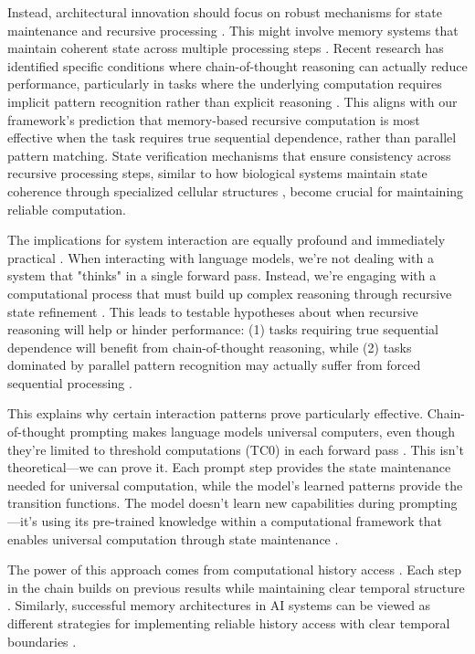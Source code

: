 \documentclass[12pt]{article}
\begin{document}
Instead, architectural innovation should focus on robust mechanisms for state maintenance and recursive processing \cite{jung2020new}.
This might involve memory systems that maintain coherent state across multiple processing steps \cite{zhu2024overcoming}.
Recent research has identified specific conditions where chain-of-thought reasoning can actually reduce performance, particularly in tasks where the underlying computation requires implicit pattern recognition rather than explicit reasoning \cite{liu2024mind}.
This aligns with our framework's prediction that memory-based recursive computation is most effective when the task requires true sequential dependence, rather than parallel pattern matching.
State verification mechanisms that ensure consistency across recursive processing steps, similar to how biological systems maintain state coherence through specialized cellular structures \cite{espinosa2024molecular}, become crucial for maintaining reliable computation.

The implications for system interaction are equally profound and immediately practical \cite{wei2022chain}.
When interacting with language models, we're not dealing with a system that "thinks" in a single forward pass.
Instead, we're engaging with a computational process that must build up complex reasoning through recursive state refinement \cite{dickson2024trust}.
This leads to testable hypotheses about when recursive reasoning will help or hinder performance: (1) tasks requiring true sequential dependence will benefit from chain-of-thought reasoning, while (2) tasks dominated by parallel pattern recognition may actually suffer from forced sequential processing \cite{liu2024mind}.

This explains why certain interaction patterns prove particularly effective.
Chain-of-thought prompting makes language models universal computers, even though they're limited to threshold computations (TC0) in each forward pass \cite{wei2022chain}.
This isn't theoretical---we can prove it.
Each prompt step provides the state maintenance needed for universal computation, while the model's learned patterns provide the transition functions.
The model doesn't learn new capabilities during prompting---it's using its pre-trained knowledge within a computational framework that enables universal computation through state maintenance \cite{ahn2024recursive}.

The power of this approach comes from computational history access \cite{fu2024memory}.
Each step in the chain builds on previous results while maintaining clear temporal structure \cite{wei2022chain}.
Similarly, successful memory architectures in AI systems can be viewed as different strategies for implementing reliable history access with clear temporal boundaries \cite{yang2013survey}.
\end{document}
